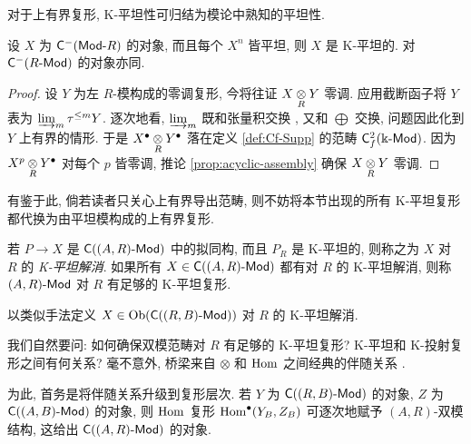 对于上有界复形, K-平坦性可归结为模论中熟知的平坦性.

\begin{proposition}\label{prop:flat-K-flat}
	设 $X$ 为 $\mathsf{C}^-(\mathsf{Mod}\text{-}R)$ 的对象, 而且每个 $X^n$ 皆平坦, 则 $X$ 是 K-平坦的. 对  $\mathsf{C}^-(R\text{-}\mathsf{Mod})$ 的对象亦同.
\end{proposition}
\begin{proof}
	设 $Y$ 为左 $R$-模构成的零调复形, 今将往证 $X \underset{R}{\otimes} Y$ 零调. 应用截断函子将 $Y$ 表为 $\varinjlim_m \tau^{\leq m} Y$. 逐次地看, $\varinjlim_m$ 既和张量积交换 \cite[命题 6.9.2]{Li1}, 又和 $\bigoplus$ 交换, 问题因此化到 $Y$ 上有界的情形. 于是 $X^\bullet \underset{R}{\otimes} Y^\bullet$ 落在定义 \ref{def:Cf-Supp} 的范畴 $\mathsf{C}^2_f(\Bbbk\text{-}\mathsf{Mod})$. 因为 $X^p \underset{R}{\otimes} Y^\bullet$ 对每个 $p$ 皆零调, 推论 \ref{prop:acyclic-assembly} 确保 $X \underset{R}{\otimes} Y$ 零调.
\end{proof}

有鉴于此, 倘若读者只关心上有界导出范畴, 则不妨将本节出现的所有 K-平坦复形都代换为由平坦模构成的上有界复形.

\begin{definition}
	若 $P \to X$ 是 $\mathsf{C}((A,R)\text{-}\mathsf{Mod})$ 中的拟同构, 而且 $P_R$ 是 K-平坦的, 则称之为 $X$ 对 $R$ 的 \emph{K-平坦解消}. 如果所有 $X \in \mathsf{C}((A, R)\text{-}\mathsf{Mod})$ 都有对 $R$ 的 K-平坦解消, 则称 $(A, R)\text{-}\mathsf{Mod}$ 对 $R$ 有足够的 K-平坦复形.
	
	以类似手法定义 $X \in \operatorname{Ob}(\mathsf{C}((R, B)\text{-}\mathsf{Mod}))$ 对 $R$ 的 K-平坦解消.
\end{definition}

我们自然要问: 如何确保双模范畴对 $R$ 有足够的 K-平坦复形? K-平坦和 K-投射复形之间有何关系? 毫不意外, 桥梁来自 $\otimes$ 和 $\operatorname{Hom}$ 之间经典的伴随关系 \cite[定理 6.6.5]{Li1}.

为此, 首务是将伴随关系升级到复形层次. 若 $Y$ 为 $\mathsf{C}((R, B)\text{-}\mathsf{Mod})$ 的对象, $Z$ 为 $\mathsf{C}((A, B)\text{-}\mathsf{Mod})$ 的对象, 则 $\operatorname{Hom}$ 复形 $\operatorname{Hom}^\bullet(Y_B, Z_B)$ 可逐次地赋予 $(A, R)$-双模结构, 这给出 $\mathsf{C}((A, R)\text{-}\mathsf{Mod})$ 的对象.

